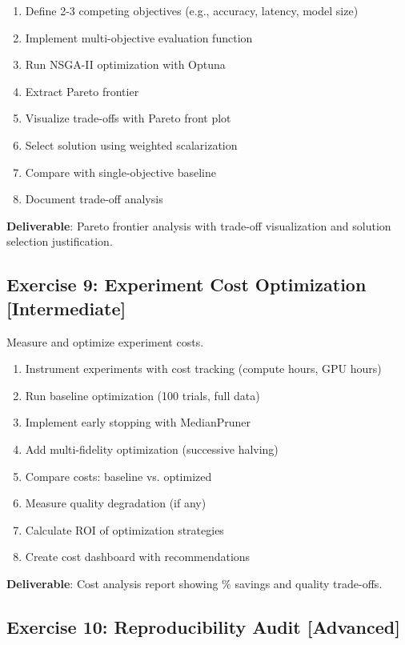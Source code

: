 \begin{enumerate}
    \item Define 2-3 competing objectives (e.g., accuracy, latency, model size)
    \item Implement multi-objective evaluation function
    \item Run NSGA-II optimization with Optuna
    \item Extract Pareto frontier
    \item Visualize trade-offs with Pareto front plot
    \item Select solution using weighted scalarization
    \item Compare with single-objective baseline
    \item Document trade-off analysis
\end{enumerate}

\textbf{Deliverable}: Pareto frontier analysis with trade-off visualization and solution selection justification.

\subsection{Exercise 9: Experiment Cost Optimization [Intermediate]}

Measure and optimize experiment costs.

\begin{enumerate}
    \item Instrument experiments with cost tracking (compute hours, GPU hours)
    \item Run baseline optimization (100 trials, full data)
    \item Implement early stopping with MedianPruner
    \item Add multi-fidelity optimization (successive halving)
    \item Compare costs: baseline vs. optimized
    \item Measure quality degradation (if any)
    \item Calculate ROI of optimization strategies
    \item Create cost dashboard with recommendations
\end{enumerate}

\textbf{Deliverable}: Cost analysis report showing \% savings and quality trade-offs.

\subsection{Exercise 10: Reproducibility Audit [Advanced]}

